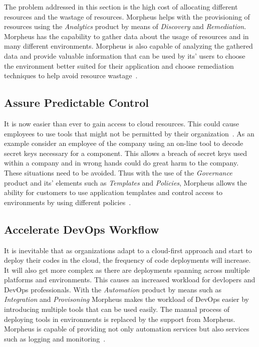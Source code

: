 The problem addressed in this section is the high cost of allocating different 
resources and the wastage of resources. Morpheus helps with the provisioning of 
resources using the \textit{Analytics} product by means of \textit{Discovery} 
and \textit{Remediation}. Morpheus has the capability to gather data about the 
usage of resources and in many different environments. Morpheus is also capable 
of analyzing the gathered data and provide valuable information that can be 
used by its' users to choose the environment better suited for their 
application and choose remediation techniques to help avoid resource 
wastage~\cite{hid-sp18-416-www-morpheus-product-guide}. 

\subsection{Assure Predictable Control}

It is now easier than ever to gain access to cloud resources. This could cause 
employees to use tools that might not be permitted by their 
organization~\cite{hid-sp18-416-www-shadowit-wikipedia}. As an example 
consider an employee of the company using an on-line tool to decode secret keys 
necessary for a component. This allows a breach of secret keys used within a 
company and in wrong hands could do great harm to the company. These 
situations need to be avoided. Thus with the use of the \textit{Governance} 
product and its' elements such as \textit{Templates} and \textit{Policies}, 
Morpheus allows the ability for customers to use application templates and 
control access to environments by using different 
policies~\cite{hid-sp18-416-www-morpheus-product-guide}.  

\subsection{Accelerate DevOps Workflow}

It is inevitable that as organizations adapt to a cloud-first approach and 
start to deploy their codes in the cloud, the frequency of code deployments 
will increase. It will also get more complex as there are deployments spanning 
across multiple platforms and environments. This causes an increased workload 
for devlopers and DevOps professionals. With the \textit{Automation} product by 
means such as \textit{Integration} and \textit{Provisoning} Morpheus makes the 
workload of DevOps easier by introducing multiple tools that can be used 
easily. The manual process of deploying tools in environments is replaced by 
the support from Morpheus. Morpheus is capable of providing not only 
automation services but also services such as logging and 
monitoring~\cite{hid-sp18-416-www-morpheus-product-guide}.  

